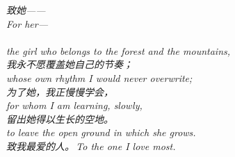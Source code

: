 
\begin{abstract}

\end{abstract}
\clearpage

\thispagestyle{empty}
\null\vfill
\begin{center}
\begin{minipage}{0.74\linewidth}
\centering\itshape\color{rose}
{\cjk 致她——}\\[0.3em]
For her---\\[0.7em]
\\[0.2em]
the girl who belongs to the forest and the mountains,\\[0.5em]
{\cjk 我永不愿覆盖她自己的节奏；}\\[0.2em]
whose own rhythm I would never overwrite;\\[0.7em]
\itshape {\cjk 为了她，我正慢慢学会，}\\[0.2em]
for whom I am learning, slowly,\\[0.5em]
{\cjk 留出她得以生长的空地。}\\[0.2em]
to leave the open ground in which she grows.\\[1.0em]
{\upshape\footnotesize\color{gold} {\cjk 致我最爱的人。}\,\;To the one I love most.}
\end{minipage}
\end{center}
\vfill\null
\clearpage


